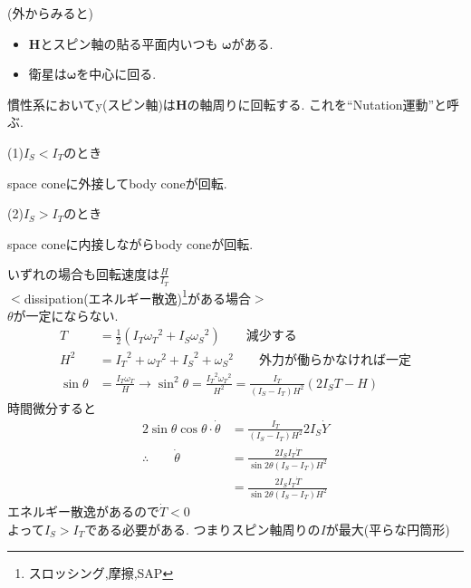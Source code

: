\documentclass[class=article, crop=false, dvipdfmx]{standalone}
\begin{document}
\noindent
(外からみると)\\
\begin{center}

\end{center}

\begin{itemize}
\item $\bm{H}$とスピン軸の貼る平面内いつも
$\bm{\omega}$がある.
\item 衛星は$\bm{\omega}$を中心に回る.
\end{itemize}
慣性系においてy(スピン軸)は$\bm{H}$の軸周りに回転する.
これを``Nutation運動''と呼ぶ.

\begin{minipage}{0.45\linewidth}
(1)$I_S<I_T$のとき


\vspace{6mm}

space coneに外接してbody coneが回転.
\end{minipage}
\hfill
\begin{minipage}{0.45\linewidth}
(2)$I_S>I_T$のとき



space coneに内接しながらbody coneが回転.
\end{minipage}
\vspace{\baselineskip}

いずれの場合も回転速度は$\frac{H}{I_T}$
\\

\noindent
$<$dissipation(エネルギー散逸)\footnote{スロッシング,摩擦,SAP}がある場合$>$\\
$\theta$が一定にならない.
\begin{align}
T&=\frac{1}{2}(I_T{\omega_T}^2+I_S{\omega_S}^2)
\qquad \text{減少する}
\label{T}\\
H^2&=
{I_T}^2+{\omega_T}^2+{I_S}^2+{\omega_S}^2\qquad
\text{外力が働らかなければ一定}
\label{H}\\
\sin\theta&=\frac{I_T \omega_T}{H}\rightarrow
\sin^2\theta=\frac{{I_T}^2{\omega_T}^2}
{H^2}=\frac{I_T}{(I_S-I_T)H^2}(2I_ST-H)
\end{align}
時間微分すると
\begin{align}
2\sin\theta \cos\theta \cdot \dot{\theta}&=
\frac{I_T}{(I_S-I_T)H^2}2I_S\dot{Y}\\
\therefore\qquad \dot{\theta}&=
\frac{2I_SI_T\dot{T}}{\sin2\theta(I_S-I_T)H^2}\\
&=\frac{2I_SI_T\dot{T}}{\sin2\theta(I_S-I_T)H^2}
\end{align}
エネルギー散逸があるので$\dot{T}<0$\\
よって$I_S>I_T$である必要がある.
つまりスピン軸周りの$I$が最大(平らな円筒形)
\end{document}
